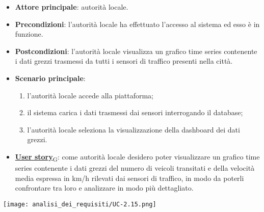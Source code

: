 \begin{itemize}
	\item \textbf{Attore principale}: autorità locale.
	\item \textbf{Precondizioni}: l'autorità locale ha effettuato l'accesso al sistema ed esso è in funzione.
	\item \textbf{Postcondizioni}: l'autorità locale visualizza un grafico time series contenente i dati grezzi trasmessi da tutti i sensori
	      di traffico presenti nella città.
	\item \textbf{Scenario principale}:
	      \begin{enumerate}
		      \item l'autorità locale accede alla piattaforma;
		      \item il sistema carica i dati trasmessi dai sensori interrogando il database;
		      \item l'autorità locale seleziona la visualizzazione della dashboard dei dati grezzi.
	      \end{enumerate}
	\item \href{https://7last.github.io/docs/rtb/documentazione-interna/glossario\#user-story}{\textbf{User story}\textsubscript{G}}:
	      come autorità locale desidero poter visualizzare un grafico time series contenente i dati grezzi del numero di veicoli transitati e della velocità media espressa in km/h
	      rilevati dai sensori di traffico, in modo da poterli confrontare tra loro e analizzare in modo più dettagliato.
\end{itemize}
\begin{center}
	\texttt{[image: analisi\_dei\_requisiti/UC-2.15.png]}
\end{center}


